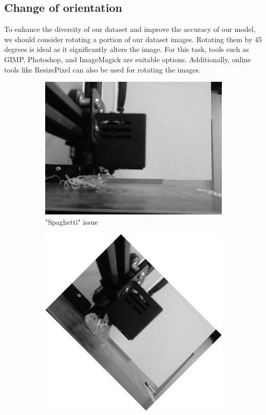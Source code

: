 \documentclass[12pt,a4paper]{article}
\begin{document}
\subsection{Change of orientation}
To enhance the diversity of our dataset and improve the accuracy of our model, we should consider rotating a portion of our dataset images. Rotating them by 45 degrees is ideal as it significantly alters the image. For this task, tools such as GIMP, Photoshop, and ImageMagick are suitable options. Additionally, online tools like ResizePixel {\scriptsize\cite{imagesOnlineTool}} can also be used for rotating the images.

\begin{figure}[h]
    \centering
    \begin{subfigure}[b]{0.45\textwidth}
        \centering
        \includegraphics[width=\textwidth]{no_support_57.jpg}
        \caption{"Spaghetti" issue\cite{onlineOpenSource1}}
        \label{fig:imageExample}
    \end{subfigure}
    \begin{subfigure}[b]{0.45\textwidth}
        \centering
        \includegraphics[width=\textwidth]{leg_broken_11.jpg}

\end{subfigure}
\end{figure}
\end{document}
